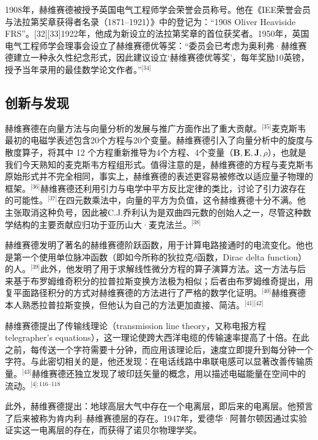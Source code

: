 1908年，赫维赛德被授予英国电气工程师学会荣誉会员称号。他在《IEE荣誉会员与法拉第奖章获得者名录（1871–1921）》中的登记为：“1908 Oliver Heaviside FRS”。[32][33]1922年，他成为新设立的法拉第奖章的首位获奖者。1950年，英国电气工程师学会理事会设立了赫维赛德优等奖：“委员会已考虑为奥利弗·赫维赛德建立一种永久性纪念形式，因此建议设立‘赫维赛德优等奖’，每年奖励10英镑，授予当年录用的最佳数学论文作者。”\(^\text{[34]}\)
\subsection{创新与发现}
赫维赛德在向量方法与向量分析的发展与推广方面作出了重大贡献。\(^\text{[35]}\)麦克斯韦最初的电磁学表述包含20个方程与20个变量。赫维赛德引入了向量分析中的旋度与散度算子，将其中 12 个方程重新推导为4个方程、4个变量（$\mathbf{B}, \mathbf{E}, \mathbf{J}, \rho$），也就是我们今天熟知的麦克斯韦方程组形式。值得注意的是，赫维赛德的方程与麦克斯韦原始形式并不完全相同，事实上，赫维赛德的表述更容易被修改以适应量子物理的框架。\(^\text{[36]}\)赫维赛德还利用引力与电学中平方反比定律的类比，讨论了引力波存在的可能性。\(^\text{[37]}\)在四元数乘法中，向量的平方为负值，这令赫维赛德十分不满。他主张取消这种负号，因此被C.J.乔利认为是双曲四元数的创始人之一，尽管这种数学结构的主要贡献应归功于亚历山大·麦克法兰。\(^\text{[38]}\)

赫维赛德发明了著名的赫维赛德阶跃函数，用于计算电路接通时的电流变化。他也是第一个使用单位脉冲函数（即如今所称的狄拉克$\delta$函数，Dirac delta function）的人。\(^\text{[39]}\)此外，他发明了用于求解线性微分方程的算子演算方法。这一方法与后来基于布罗姆维奇积分的拉普拉斯变换方法极为相似；后者由布罗姆维奇提出，用复平面路径积分的方式对赫维赛德的方法进行了严格的数学化证明。\(^\text{[40]}\)赫维赛德本人熟悉拉普拉斯变换，但他认为自己的方法更加直接、简洁。\(^\text{[41][42]}\)

赫维赛德提出了传输线理论（transmission line theory，又称电报方程telegrapher’s equations），这一理论使跨大西洋电缆的传输速率提高了十倍。在此之前，每传送一个字符需要十分钟，而应用该理论后，速度立即提升到每分钟一个字符。与此密切相关的是，他还发现：在电话线路中串联电感可以显著改善传输质量。\(^\text{[43]}\)赫维赛德还独立发现了坡印廷矢量的概念，用以描述电磁能量在空间中的流动。\(^\text{[4]: 116–118 }\)

此外，赫维赛德提出：地球高层大气中存在一个电离层，即后来的电离层。他预言了后来被称为肯内利–赫维赛德层的存在。1947年，爱德华·阿普尔顿因通过实验证实这一电离层的存在，而获得了诺贝尔物理学奖。
